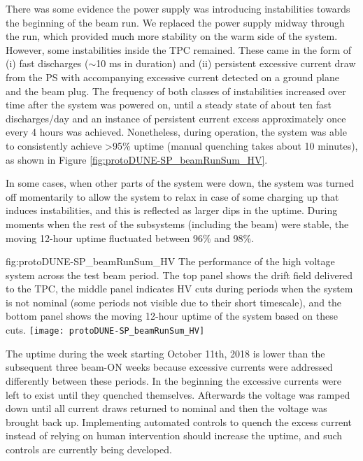 There was some evidence the power supply was introducing instabilities towards the beginning of the beam run.
We replaced the power supply midway through the run, which provided much more stability on the warm side of the  system.
However, some instabilities inside the TPC remained.
These came in the form of (i) fast discharges ($\sim$10 ms in duration) and (ii) persistent excessive current draw from the PS with accompanying excessive current detected on a ground plane and the beam plug.
The frequency of both classes of instabilities increased over time after the system was powered on, until a steady state of about ten fast discharges/day and an instance of persistent current excess approximately once every 4 hours was achieved.
Nonetheless, during operation, the  system was able to consistently achieve >95\% uptime (manual quenching takes about 10 minutes), as shown in Figure \ref{fig:protoDUNE-SP_beamRunSum_HV}.

In some cases, when other parts of the system were down, the  system was turned off momentarily to allow the system to relax in case of some charging up that induces instabilities, and this is reflected as larger dips in the uptime.
During moments when the rest of the subsystems (including the beam) were stable, the moving 12-hour  uptime fluctuated between 96\% and 98\%.

\begin{dunefigure}
{fig:protoDUNE-SP_beamRunSum_HV}
{The performance of the high voltage system across the test beam period. The top panel shows the drift field delivered to the TPC, the middle panel indicates HV cuts during periods when the system is not nominal (some periods not visible due to their short timescale), and the bottom panel shows the moving 12-hour uptime of the  system based on these  cuts.
}
\texttt{[image: protoDUNE-SP\_beamRunSum\_HV]}
\end{dunefigure}

The uptime during the week starting October 11th, 2018 is lower than the subsequent three beam-ON weeks because excessive currents were addressed differently between these periods.
In the beginning the excessive currents were left to exist until they quenched themselves.
Afterwards the voltage was ramped down until all current draws returned to nominal and then the voltage was brought back up.
Implementing automated controls to quench the excess current instead of relying on human intervention should increase the uptime, and such controls are currently being developed.

